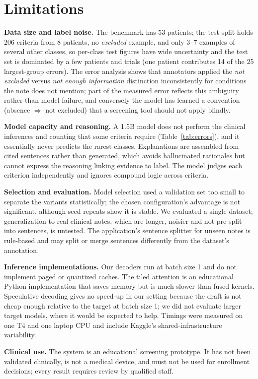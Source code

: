 \section{Limitations}
\label{sec:limitations}

\textbf{Data size and label noise.} The benchmark has 53 patients; the test split holds 206
criteria from 8 patients, no \emph{excluded} example, and only 3--7 examples of several other
classes, so per-class test figures have wide uncertainty and the test set is dominated by a few
patients and trials (one patient contributes 14 of the 25 largest-group errors). The error analysis
shows that annotators applied the \emph{not excluded} versus \emph{not enough information}
distinction inconsistently for conditions the note does not mention; part of the measured error
reflects this ambiguity rather than model failure, and conversely the model has learned a convention
(absence $\Rightarrow$ not excluded) that a screening tool should not apply blindly.

\textbf{Model capacity and reasoning.} A 1.5B model does not perform the clinical inferences and
counting that some criteria require (Table~\ref{tab:errors}), and it essentially never predicts the
rarest classes. Explanations are assembled from cited sentences rather than generated, which avoids
hallucinated rationales but cannot express the reasoning linking evidence to label. The model judges
each criterion independently and ignores compound logic across criteria.

\textbf{Selection and evaluation.} Model selection used a validation set too small to separate the
variants statistically; the chosen configuration's advantage is not significant, although seed
repeats show it is stable. We evaluated a single dataset; generalization to real clinical notes,
which are longer, noisier and not pre-split into sentences, is untested. The application's sentence
splitter for unseen notes is rule-based and may split or merge sentences differently from the
dataset's annotation.

\textbf{Inference implementations.} Our decoders run at batch size 1 and do not implement paged or
quantized caches. The tiled attention is an educational Python implementation that saves memory but
is much slower than fused kernels. Speculative decoding gives no speed-up in our setting because the
draft is not cheap enough relative to the target at batch size 1; we did not evaluate larger target
models, where it would be expected to help. Timings were measured on one T4 and one laptop CPU and
include Kaggle's shared-infrastructure variability.

\textbf{Clinical use.} The system is an educational screening prototype. It has not been validated
clinically, is not a medical device, and must not be used for enrollment decisions; every result
requires review by qualified staff.
